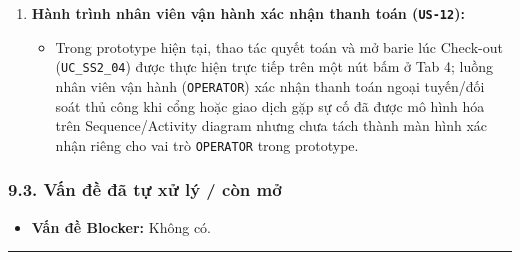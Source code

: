 \documentclass[11pt,a4paper]{article}
\providecommand{\tightlist}{%
  \setlength{\itemsep}{0pt}\setlength{\parskip}{0pt}}
\begin{document}
\begin{enumerate}
  \begin{itemize}
  \tightlist
  \item
    \textbf{Hiện trạng prototype:} Khi xe cá nhân Check-in có nhu cầu
    sạc, \texttt{src/core/personal\_ev.py} mới chỉ giảm trực tiếp biến
    đếm \texttt{hub{[}"charging\_ports"{]}{[}"available"{]}\ -=\ 1} chứ
    chưa tự động gọi \texttt{SmartChargingScheduler.add\_request()} bên
    \texttt{src/core/scheduler.py} (SS5); khi Check-out, người dùng nhập
    \texttt{kwh\_charged} và \texttt{overstay\_minutes} giả lập trên UI
    để hàm \texttt{check\_out\_personal\_ev} tự tính tiền điện và phí
    quá giờ.
  \item
    \textbf{Thiết kế mục tiêu Sub3:} Chuẩn hóa thông qua hợp đồng
    \texttt{INT-01} (\texttt{ChargingService.request\_charging}) lúc
    Check-in và \texttt{INT-02} (\texttt{ChargingService.get\_bill}) lúc
    Check-out để SS5 độc quyền quản lý hàng chờ, cấp cổng và tính phí
    điện/quá giờ.
  \end{itemize}
\item
  \textbf{Hành trình nhân viên vận hành xác nhận thanh toán
  (\texttt{US-12}):}

  \begin{itemize}
  \tightlist
  \item
    Trong prototype hiện tại, thao tác quyết toán và mở barie lúc
    Check-out (\texttt{UC\_SS2\_04}) được thực hiện trực tiếp trên một
    nút bấm ở Tab 4; luồng nhân viên vận hành (\texttt{OPERATOR}) xác
    nhận thanh toán ngoại tuyến/đối soát thủ công khi cổng hoặc giao
    dịch gặp sự cố đã được mô hình hóa trên Sequence/Activity diagram
    nhưng chưa tách thành màn hình xác nhận riêng cho vai trò
    \texttt{OPERATOR} trong prototype.
  \end{itemize}
\end{enumerate}

\hypertarget{vux1ea5n-ux111ux1ec1-ux111uxe3-tux1ef1-xux1eed-luxfd-cuxf2n-mux1edf}{%
\subsubsection{9.3. Vấn đề đã tự xử lý / còn
mở}\label{vux1ea5n-ux111ux1ec1-ux111uxe3-tux1ef1-xux1eed-luxfd-cuxf2n-mux1edf}}

\begin{itemize}
\tightlist
\item
  \textbf{Vấn đề Blocker:} Không có.
\end{itemize}

\begin{center}\rule{0.5\linewidth}{0.5pt}\end{center}
\end{document}
